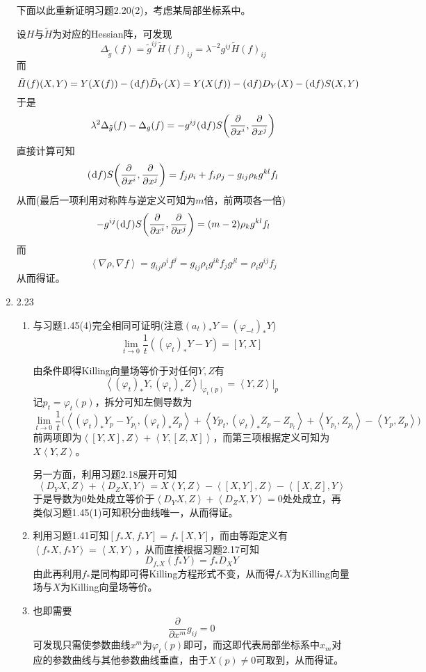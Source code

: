 \documentclass[a4paper,UTF8,fontset=windows,10pt]{ctexart}
\newcommand*{\dr}{\hspace{0.07em}\mathrm{d}}
\begin{document}
\begin{enumerate}
    下面以此重新证明习题2.20(2)，考虑某局部坐标系中。
    
    设$H$与$\tilde{H}$为对应的Hessian阵，可发现
    $$\Delta_{\tilde{g}}(f)=\tilde{g}^{ij}\tilde{H}(f)_{ij}=\lambda^{-2}g^{ij}\tilde{H}(f)_{ij}$$
    而
    $$\tilde{H}(f)(X,Y)=Y(X(f))-(\dr f)\tilde{D}_Y(X)=Y(X(f))-(\dr f)D_Y(X)-(\dr f)S(X,Y)$$
    于是
    $$\lambda^2\Delta_{\tilde{g}}(f)-\Delta_g(f)=-g^{ij}(\dr f)S\bigg(\frac{\partial}{\partial x^i},\frac{\partial}{\partial x^j}\bigg)$$
    直接计算可知
    $$(\dr f)S\bigg(\frac{\partial}{\partial x^i},\frac{\partial}{\partial x^j}\bigg)=f_j\rho_i+f_i\rho_j-g_{ij}\rho_kg^{kl}f_l$$
    从而(最后一项利用对称阵与逆定义可知为$m$倍，前两项各一倍)
    $$-g^{ij}(\dr f)S\bigg(\frac{\partial}{\partial x^i},\frac{\partial}{\partial x^j}\bigg)=(m-2)\rho_kg^{kl}f_l$$
    而
    $$\left<\nabla\rho,\nabla f\right>=g_{ij}\rho^if^j=g_{ij}\rho_ig^{ik}f_jg^{jl}=\rho_ig^{ij}f_j$$
    从而得证。
    
    \item 2.23
    \begin{enumerate}[(1)]
        \item 与习题1.45(4)完全相同可证明(注意$(a_t)_*Y=(\varphi_{-t})_*Y$)
        $$\lim_{t\to0}\frac{1}{t}((\varphi_t)_*Y-Y)=[Y,X]$$
        
        由条件即得Killing向量场等价于对任何$Y,Z$有
        $$\left<(\varphi_t)_*Y,(\varphi_t)_*Z\right>\big|_{\varphi_t(p)}=\left<Y,Z\right>\big|_p$$
        记$p_t=\varphi_t(p)$，拆分可知左侧导数为
        $$\lim_{t\to0}\frac{1}{t}\big(\left<(\varphi_t)_*Y_p-Y_{p_t},(\varphi_t)_*Z_p\right>+\left<Yp_t,(\varphi_t)_*Z_p-Z_{p_t}\right>+\left<Y_{p_t},Z_{p_t}\right>-\left<Y_p,Z_p\right>\big)$$
        前两项即为$\left<[Y,X],Z\right>+\left<Y,[Z,X]\right>$，而第三项根据定义可知为$X\left<Y,Z\right>$。
    
        另一方面，利用习题2.18展开可知
        $$\left<D_YX,Z\right>+\left<D_ZX,Y\right>=X\left<Y,Z\right>-\left<[X,Y],Z\right>-\left<[X,Z],Y\right>$$
        于是导数为0处处成立等价于$\left<D_YX,Z\right>+\left<D_ZX,Y\right>=0$处处成立，再类似习题1.45(1)可知积分曲线唯一，从而得证。
    
        \item 利用习题1.41可知$[f_*X,f_*Y]=f_*[X,Y]$，而由等距定义有$\left<f_*X,f_*Y\right>=\left<X,Y\right>$，从而直接根据习题2.17可知
        $$D_{f_*X}(f_*Y)=f_*D_XY$$
        由此再利用$f_*$是同构即可得Killing方程形式不变，从而得$f_*X$为Killing向量场与$X$为Killing向量场等价。
    
        \item 也即需要
        $$\frac{\partial}{\partial x^m}g_{ij}=0$$
        可发现只需使参数曲线$x^m$为$\varphi_t(p)$即可，而这即代表局部坐标系中$x_m$对应的参数曲线与其他参数曲线垂直，由于$X(p)\ne0$可取到，从而得证。
        

\end{enumerate}
\end{enumerate}
\end{document}
